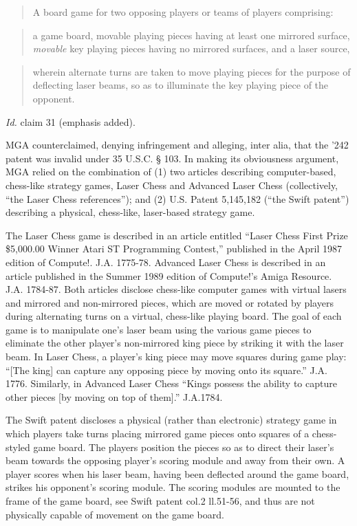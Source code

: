 \begin{quote}
A board game for two opposing players or teams of players comprising:
\end{quote}

\begin{quote}
a game board, movable playing pieces having at least one mirrored surface,
\textit{movable} key playing pieces having no mirrored surfaces, and a laser
source,
\end{quote}

\begin{quote}
wherein alternate turns are taken to move playing pieces for the purpose of
deflecting laser beams, so as to illuminate the key playing piece of the
opponent.
\end{quote}

\textit{Id.} claim 31 (emphasis added).

MGA counterclaimed, denying infringement and alleging, inter alia, that the '242
patent was invalid under 35 U.S.C. {\S} 103. In making its obviousness
argument, MGA relied on the combination of (1) two articles describing
computer-based, chess-like strategy games, Laser Chess and Advanced Laser Chess
(collectively, ``the Laser Chess references''); and (2) U.S. Patent 5,145,182
(``the Swift patent'') describing a physical, chess-like, laser-based strategy
game.

The Laser Chess game is described in an article entitled ``Laser
Chess{\texttrademark} First Prize \$5,000.00 Winner Atari ST Programming
Contest,'' published in the April 1987 edition of Compute!. J.A. 1775-78.
Advanced Laser Chess is described in an article published in the Summer 1989
edition of Compute!'s Amiga Resource. J.A. 1784-87. Both articles disclose
chess-like computer games with virtual lasers and mirrored and non-mirrored
pieces, which are moved or rotated by players during alternating turns on a
virtual, chess-like playing board. The goal of each game is to manipulate one's
laser beam using the various game pieces to eliminate the other player's
non-mirrored king piece by striking it with the laser beam. In Laser Chess, a
player's king piece may move squares during game play: ``[The king] can capture
any opposing piece by moving onto its square.'' J.A. 1776. Similarly, in
Advanced Laser Chess ``Kings possess the ability to capture other pieces [by
moving on top of them].'' J.A.1784.

The Swift patent discloses a physical (rather than electronic) strategy game in
which players take turns placing mirrored game pieces onto squares of a
chess-styled game board. The players position the pieces so as to direct their
laser's beam towards the opposing player's scoring module and away from their
own. A player scores when his laser beam, having been deflected around the game
board, strikes his opponent's scoring module. The scoring modules are mounted
to the frame of the game board, see Swift patent col.2 ll.51-56, and thus are
not physically capable of movement on the game board.

